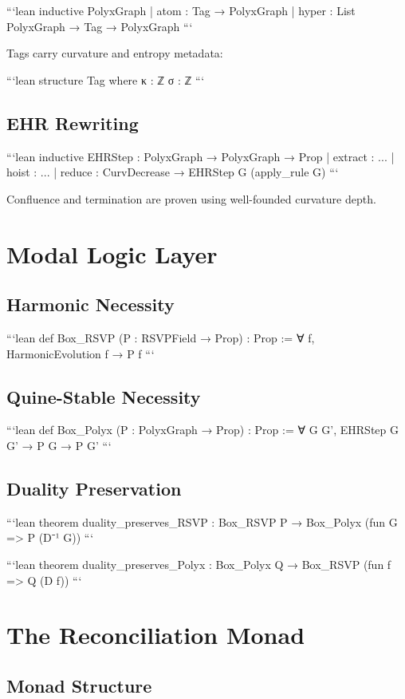 ```lean
inductive PolyxGraph
| atom : Tag → PolyxGraph
| hyper : List PolyxGraph → Tag → PolyxGraph
```

Tags carry curvature and entropy metadata:

```lean
structure Tag where
  κ : ℤ
  σ : ℤ
```

\subsection{EHR Rewriting}

```lean
inductive EHRStep : PolyxGraph → PolyxGraph → Prop
| extract : ...
| hoist   : ...
| reduce  : CurvDecrease → EHRStep G (apply_rule G)
```

Confluence and termination are proven using well-founded curvature depth.

\section{Modal Logic Layer}

\subsection{Harmonic Necessity}

```lean
def Box_RSVP (P : RSVPField → Prop) : Prop :=
  ∀ f, HarmonicEvolution f → P f
```

\subsection{Quine-Stable Necessity}

```lean
def Box_Polyx (P : PolyxGraph → Prop) : Prop :=
  ∀ G G', EHRStep G G' → P G → P G'
```

\subsection{Duality Preservation}

```lean
theorem duality_preserves_RSVP :
  Box_RSVP P → Box_Polyx (fun G => P (D⁻¹ G))
```

```lean
theorem duality_preserves_Polyx :
  Box_Polyx Q → Box_RSVP (fun f => Q (D f))
```

\section{The Reconciliation Monad}

\subsection{Monad Structure}

